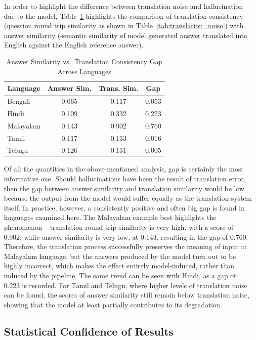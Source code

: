 \documentclass[conference]{IEEEtran}
\begin{document}
In order to highlight the difference between translation noise and 
hallucination due to the model, Table~\ref{tab:gap_analysis} 
highlights the comparison of translation consistency 
(question round trip similarity as shown in Table~\ref{tab:translation_noise}) 
with answer similarity (semantic similarity of model generated 
answer translated into English against the English reference answer).

\begin{table}[h]
\centering
\caption{Answer Similarity vs.\ Translation Consistency Gap 
Across Languages}
\label{tab:gap_analysis}
\begin{tabular}{lccc}
\hline
\textbf{Language} & \textbf{Answer Sim.} & \textbf{Trans. Sim.} 
& \textbf{Gap} \\
\hline
Bengali   & 0.065 & 0.117 & 0.053 \\
Hindi     & 0.109 & 0.332 & 0.223 \\
Malayalam & 0.143 & 0.902 & 0.760 \\
Tamil     & 0.117 & 0.133 & 0.016 \\
Telugu    & 0.126 & 0.131 & 0.005 \\
\hline
\end{tabular}
\end{table}

Of all the quantities in the above-mentioned analysis, gap is certainly the most informative one.
Should hallucinations have been the result of translation error, then the gap between 
answer similarity and translation similarity would be low because the output from the 
model would suffer equally as the translation system itself. In practice, however, a 
consistently positive and often big gap is found in languages examined here. The 
Malayalam example best highlights the phenomenon – translation round-trip similarity 
is very high, with a score of 0.902, while answer similarity is very low, at 0.143, 
resulting in the gap of 0.760. Therefore, the translation process successfully 
preserves the meaning of input in Malayalam language, but the answers produced by the 
model turn out to be highly incorrect, which makes the effect entirely model-induced, 
rather than induced by the pipeline. The same trend can be seen with Hindi, as a gap 
of 0.223 is recorded. For Tamil and Telugu, where higher levels of translation 
noise can be found, the scores of answer similarity still remain below translation 
noise, showing that the model at least partially contributes to its degradation.

\subsection{Statistical Confidence of Results}
\end{document}

